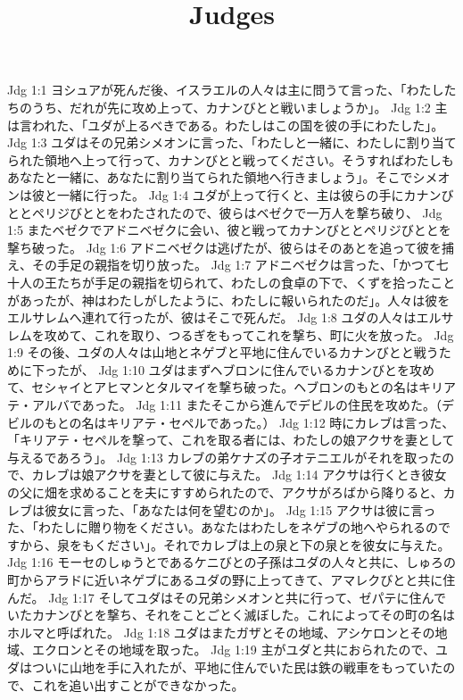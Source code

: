 

\title{Judges}

Jdg 1:1  ヨシュアが死んだ後、イスラエルの人々は主に問うて言った、「わたしたちのうち、だれが先に攻め上って、カナンびとと戦いましょうか」。
Jdg 1:2  主は言われた、「ユダが上るべきである。わたしはこの国を彼の手にわたした」。
Jdg 1:3  ユダはその兄弟シメオンに言った、「わたしと一緒に、わたしに割り当てられた領地へ上って行って、カナンびとと戦ってください。そうすればわたしもあなたと一緒に、あなたに割り当てられた領地へ行きましょう」。そこでシメオンは彼と一緒に行った。
Jdg 1:4  ユダが上って行くと、主は彼らの手にカナンびととペリジびととをわたされたので、彼らはベゼクで一万人を撃ち破り、
Jdg 1:5  またベゼクでアドニベゼクに会い、彼と戦ってカナンびととペリジびととを撃ち破った。
Jdg 1:6  アドニベゼクは逃げたが、彼らはそのあとを追って彼を捕え、その手足の親指を切り放った。
Jdg 1:7  アドニベゼクは言った、「かつて七十人の王たちが手足の親指を切られて、わたしの食卓の下で、くずを拾ったことがあったが、神はわたしがしたように、わたしに報いられたのだ」。人々は彼をエルサレムへ連れて行ったが、彼はそこで死んだ。
Jdg 1:8  ユダの人々はエルサレムを攻めて、これを取り、つるぎをもってこれを撃ち、町に火を放った。
Jdg 1:9  その後、ユダの人々は山地とネゲブと平地に住んでいるカナンびとと戦うために下ったが、
Jdg 1:10  ユダはまずヘブロンに住んでいるカナンびとを攻めて、セシャイとアヒマンとタルマイを撃ち破った。ヘブロンのもとの名はキリアテ・アルバであった。
Jdg 1:11  またそこから進んでデビルの住民を攻めた。（デビルのもとの名はキリアテ・セペルであった。）
Jdg 1:12  時にカレブは言った、「キリアテ・セペルを撃って、これを取る者には、わたしの娘アクサを妻として与えるであろう」。
Jdg 1:13  カレブの弟ケナズの子オテニエルがそれを取ったので、カレブは娘アクサを妻として彼に与えた。
Jdg 1:14  アクサは行くとき彼女の父に畑を求めることを夫にすすめられたので、アクサがろばから降りると、カレブは彼女に言った、「あなたは何を望むのか」。
Jdg 1:15  アクサは彼に言った、「わたしに贈り物をください。あなたはわたしをネゲブの地へやられるのですから、泉をもください」。それでカレブは上の泉と下の泉とを彼女に与えた。
Jdg 1:16  モーセのしゅうとであるケニびとの子孫はユダの人々と共に、しゅろの町からアラドに近いネゲブにあるユダの野に上ってきて、アマレクびとと共に住んだ。
Jdg 1:17  そしてユダはその兄弟シメオンと共に行って、ゼパテに住んでいたカナンびとを撃ち、それをことごとく滅ぼした。これによってその町の名はホルマと呼ばれた。
Jdg 1:18  ユダはまたガザとその地域、アシケロンとその地域、エクロンとその地域を取った。
Jdg 1:19  主がユダと共におられたので、ユダはついに山地を手に入れたが、平地に住んでいた民は鉄の戦車をもっていたので、これを追い出すことができなかった。
